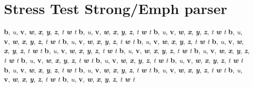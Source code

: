 \part{Stress Test Strong\slash Emph parser}
\label{stressteststrongemphparser}

\textbf{b}, \emph{u}, \textbf{v}, \emph{\textbf{w}}, \emph{\textbf{x}}, \textbf{\emph{y}}, \textbf{\emph{z}}, \emph{t \textbf{w} t}
\textbf{b}, \emph{u}, \textbf{v}, \emph{\textbf{w}}, \emph{\textbf{x}}, \textbf{\emph{y}}, \textbf{\emph{z}}, \emph{t \textbf{w} t}
\textbf{b}, \emph{u}, \textbf{v}, \emph{\textbf{w}}, \emph{\textbf{x}}, \textbf{\emph{y}}, \textbf{\emph{z}}, \emph{t \textbf{w} t}
\textbf{b}, \emph{u}, \textbf{v}, \emph{\textbf{w}}, \emph{\textbf{x}}, \textbf{\emph{y}}, \textbf{\emph{z}}, \emph{t \textbf{w} t}
\textbf{b}, \emph{u}, \textbf{v}, \emph{\textbf{w}}, \emph{\textbf{x}}, \textbf{\emph{y}}, \textbf{\emph{z}}, \emph{t \textbf{w} t}
\textbf{b}, \emph{u}, \textbf{v}, \emph{\textbf{w}}, \emph{\textbf{x}}, \textbf{\emph{y}}, \textbf{\emph{z}}, \emph{t \textbf{w} t}
\textbf{b}, \emph{u}, \textbf{v}, \emph{\textbf{w}}, \emph{\textbf{x}}, \textbf{\emph{y}}, \textbf{\emph{z}}, \emph{t \textbf{w} t}
\textbf{b}, \emph{u}, \textbf{v}, \emph{\textbf{w}}, \emph{\textbf{x}}, \textbf{\emph{y}}, \textbf{\emph{z}}, \emph{t \textbf{w} t}
\textbf{b}, \emph{u}, \textbf{v}, \emph{\textbf{w}}, \emph{\textbf{x}}, \textbf{\emph{y}}, \textbf{\emph{z}}, \emph{t \textbf{w} t}
\textbf{b}, \emph{u}, \textbf{v}, \emph{\textbf{w}}, \emph{\textbf{x}}, \textbf{\emph{y}}, \textbf{\emph{z}}, \emph{t \textbf{w} t}
\textbf{b}, \emph{u}, \textbf{v}, \emph{\textbf{w}}, \emph{\textbf{x}}, \textbf{\emph{y}}, \textbf{\emph{z}}, \emph{t \textbf{w} t}
\textbf{b}, \emph{u}, \textbf{v}, \emph{\textbf{w}}, \emph{\textbf{x}}, \textbf{\emph{y}}, \textbf{\emph{z}}, \emph{t \textbf{w} t}
\textbf{b}, \emph{u}, \textbf{v}, \emph{\textbf{w}}, \emph{\textbf{x}}, \textbf{\emph{y}}, \textbf{\emph{z}}, \emph{t \textbf{w} t}
\textbf{b}, \emph{u}, \textbf{v}, \emph{\textbf{w}}, \emph{\textbf{x}}, \textbf{\emph{y}}, \textbf{\emph{z}}, \emph{t \textbf{w} t}
\textbf{b}, \emph{u}, \textbf{v}, \emph{\textbf{w}}, \emph{\textbf{x}}, \textbf{\emph{y}}, \textbf{\emph{z}}, \emph{t \textbf{w} t}
\textbf{b}, \emph{u}, \textbf{v}, \emph{\textbf{w}}, \emph{\textbf{x}}, \textbf{\emph{y}}, \textbf{\emph{z}}, \emph{t \textbf{w} t}
\textbf{b}, \emph{u}, \textbf{v}, \emph{\textbf{w}}, \emph{\textbf{x}}, \textbf{\emph{y}}, \textbf{\emph{z}}, \emph{t \textbf{w} t}
\textbf{b}, \emph{u}, \textbf{v}, \emph{\textbf{w}}, \emph{\textbf{x}}, \textbf{\emph{y}}, \textbf{\emph{z}}, \emph{t \textbf{w} t}
